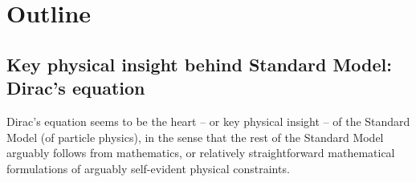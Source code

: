 

\chapter{Outline}
\setcounter{theorem}{0}
\setcounter{equation}{0}


\renewcommand{\theenumi}{\roman{enumi}}
\renewcommand{\labelenumi}{\textnormal{(\theenumi)}$\;\;$}


\section{Key physical insight behind Standard Model: Dirac's equation}
Dirac's equation seems to be the heart -- or key physical insight -- of the Standard Model (of particle physics),
in the sense that the rest of the Standard Model arguably follows from mathematics, or relatively straightforward
mathematical formulations of arguably self-evident physical constraints.
